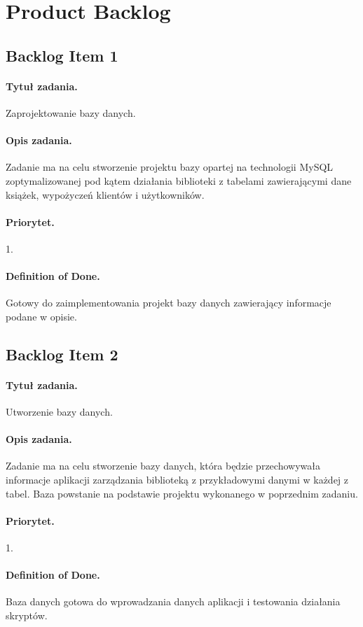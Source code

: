 \documentclass[a4paper]{article}
\begin{document}
\section{Product Backlog}

\subsection{Backlog Item 1}
\paragraph{Tytuł zadania.} Zaprojektowanie bazy danych.
\paragraph{Opis zadania.} Zadanie ma na celu stworzenie projektu bazy opartej na technologii MySQL zoptymalizowanej pod kątem działania biblioteki z tabelami zawierającymi dane książek, wypożyczeń klientów i użytkowników.
\paragraph{Priorytet.} 1.
\paragraph{Definition of Done.} Gotowy do zaimplementowania projekt bazy danych zawierający informacje podane w opisie.

\subsection{Backlog Item 2}
\paragraph{Tytuł zadania.} Utworzenie bazy danych.
\paragraph{Opis zadania.} Zadanie ma na celu stworzenie bazy danych, która będzie przechowywała informacje aplikacji zarządzania biblioteką  z przykładowymi danymi w każdej z tabel. Baza powstanie na podstawie projektu wykonanego w poprzednim zadaniu.
\paragraph{Priorytet.} 1.
\paragraph{Definition of Done.} Baza danych gotowa do wprowadzania danych aplikacji i testowania działania skryptów.
\end{document}
